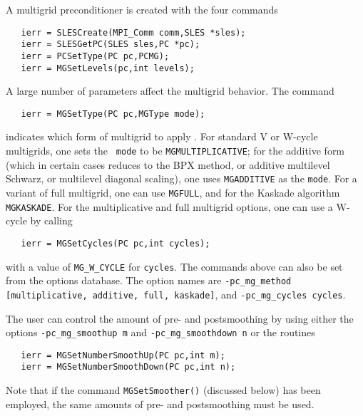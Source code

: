 A multigrid preconditioner is created with the four commands 
\begin{verbatim}
   ierr = SLESCreate(MPI_Comm comm,SLES *sles);
   ierr = SLESGetPC(SLES sles,PC *pc);
   ierr = PCSetType(PC pc,PCMG);
   ierr = MGSetLevels(pc,int levels);
\end{verbatim}
A  
large number of parameters affect the multigrid behavior. The command
\begin{verbatim}
   ierr = MGSetType(PC pc,MGType mode); 
\end{verbatim}
indicates   which
   form of
multigrid to apply \cite{1sbg}. 
For standard V or W-cycle multigrids, one sets the {\tt
mode} to be  {\tt MGMULTIPLICATIVE}; for the
additive form (which in certain cases reduces to the BPX method, or additive 
multilevel Schwarz, or multilevel diagonal scaling), one uses
 {\tt MGADDITIVE} as the {\tt mode}.  For a variant
of full multigrid, one can
 use  {\tt MGFULL}, and for the Kaskade 
algorithm  {\tt MGKASKADE}.
For the multiplicative and full multigrid options, one can use a
W-cycle by   calling
 
\begin{verbatim}
   ierr = MGSetCycles(PC pc,int cycles);
\end{verbatim}
with a value of {\tt MG\_W\_CYCLE} for {\tt cycles}. 
The commands above can also be set from the options database. The option 
names are {\tt -pc\_mg\_method [multiplicative, additive, full, kaskade]},
and {\tt -pc\_mg\_cycles cycles}.  

The user can control the amount of pre- and postsmoothing 
  by using
either the options  
{\tt -pc\_mg\_smoothup~m} and {\tt -pc\_mg\_smoothdown~n} or
the routines  
\begin{verbatim}
   ierr = MGSetNumberSmoothUp(PC pc,int m);
   ierr = MGSetNumberSmoothDown(PC pc,int n);
\end{verbatim}
Note that if the command {\tt MGSetSmoother()} (discussed below) has
 been employed, the same amounts of pre-
and postsmoothing must be used.

